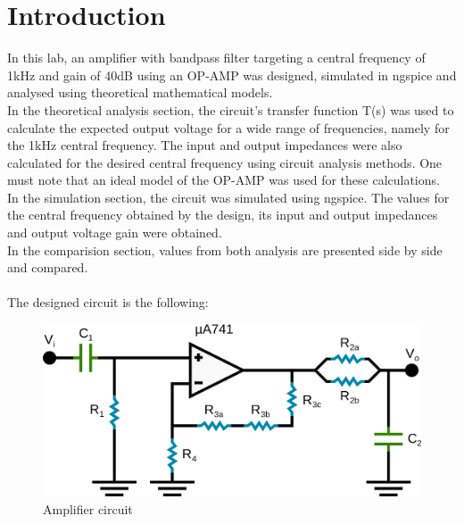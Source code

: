 \section{Introduction}
\label{sec:intro}
In this lab, an amplifier with bandpass filter targeting a central frequency of 1kHz and gain of 40dB using an OP-AMP was designed, simulated in ngspice and analysed using theoretical mathematical models.\\
 In the theoretical analysis section, the circuit's transfer function T(s) was used to calculate the expected output voltage for a wide range of frequencies, namely for the 1kHz central frequency. The input and output impedances were also calculated for the desired central frequency using circuit analysis methods. One must note that an ideal model of the OP-AMP was used for these calculations. \\
 In the simulation section, the circuit was simulated using ngspice. The values for the central frequency obtained by the design, its input and output impedances and output voltage gain were obtained.\\
In the comparision section, values from both analysis are presented side by side and compared.\\ \\
The designed circuit is the following:

\begin{figure} [!htb] 
  \includegraphics[width=\linewidth]{circuit.png}
  \vspace{1cm}
  \caption{Amplifier circuit}
  \label{fig:circuit}
  \hfill
\end{figure}



\FloatBarrier
